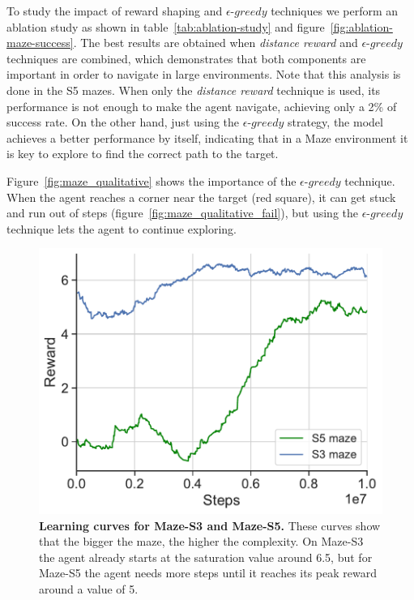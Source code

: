 To study the impact of reward shaping and $\epsilon\text{-}greedy$ techniques we perform an ablation study as shown in table~\ref{tab:ablation-study} and figure~\ref{fig:ablation-maze-success}.
The best results are obtained when \textit{distance reward} and $\epsilon\text{-}greedy$ techniques are combined, which demonstrates that both components are important in order to navigate in large environments.
Note that this analysis is done in the S5 mazes.
When only the \textit{distance reward} technique is used, its performance is not enough to make the agent navigate, achieving only a 2\% of success rate.
On the other hand, just using the $\epsilon\text{-}greedy$ strategy, the model achieves a better performance by itself, indicating that in a Maze environment it is key to explore to find the correct path to the target.

Figure~\ref{fig:maze_qualitative} shows the importance of the $\epsilon\text{-}greedy$ technique.
When the agent reaches a corner near the target (red square), it can get stuck and run out of steps (figure~\ref{fig:maze_qualitative_fail}), but using the $\epsilon\text{-}greedy$ technique lets the agent to continue exploring.

\begin{figure}
    \centering
    \includegraphics[width=0.8\linewidth]{figures/understanding_vsn/S3_S5_reward}
    \caption{\textbf{Learning curves for Maze-S3 and Maze-S5.} These curves show that the bigger the maze, the higher the complexity. On Maze-S3 the agent already starts at the saturation value around 6.5, but for Maze-S5 the agent needs more steps until it reaches its peak reward around a value of 5.}
    \label{fig:reward-maze-results}
\end{figure}

